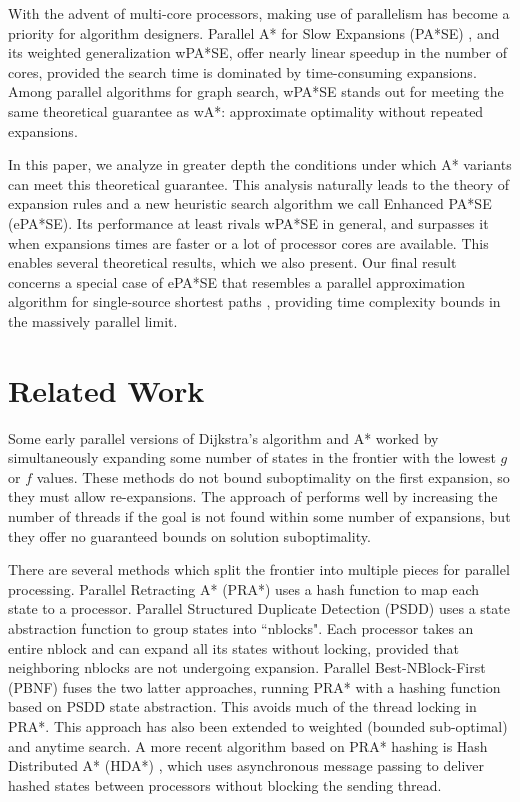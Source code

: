 \documentclass[letterpaper]{article}
\begin{document}
With the advent of multi-core processors, making use of parallelism has become a priority for algorithm designers. Parallel A* for Slow Expansions (PA*SE) \cite{phillips2014pa}, and its weighted generalization wPA*SE, offer nearly linear speedup in the number of cores, provided the search time is dominated by time-consuming expansions. Among parallel algorithms for graph search, wPA*SE stands out for meeting the same theoretical guarantee as wA*: approximate optimality without repeated expansions.

In this paper, we analyze in greater depth the conditions under which A* variants can meet this theoretical guarantee. This analysis naturally leads to the theory of expansion rules and a new heuristic search algorithm we call Enhanced PA*SE (ePA*SE). Its performance at least rivals wPA*SE in general, and surpasses it when expansions times are faster or a lot of processor cores are available. This enables several theoretical results, which we also present. Our final result concerns a special case of ePA*SE that resembles a parallel approximation algorithm for single-source shortest paths \cite{klein1997randomized}, providing time complexity bounds in the massively parallel limit.

\section{Related Work}

Some early parallel versions of Dijkstra’s algorithm \cite{quinn86} and A* \cite{irani86} \cite{leifker85} worked by simultaneously expanding some number of states in the frontier with the lowest $g$ or $f$ values. These methods do not bound suboptimality on the first expansion, so they must allow re-expansions.
The approach of \cite{vidal10} performs well by increasing the number of threads if the goal is not found within some number of expansions, but they offer no guaranteed bounds on solution suboptimality.

There are several methods which split the frontier into multiple pieces for parallel processing.
Parallel Retracting A* (PRA*) \cite{evett95} uses a hash function to map each state to a processor.
Parallel Structured Duplicate Detection (PSDD) \cite{zhou07}
uses a state abstraction function to group states into
``nblocks".
Each processor takes an entire nblock and can expand all its states without locking, provided
that neighboring nblocks are not undergoing expansion.
Parallel Best-NBlock-First (PBNF) \cite{burns_10} fuses the two latter
approaches, running PRA* with a hashing function
based on PSDD state abstraction.
This avoids much of the thread locking in PRA*.
This approach has also been extended to weighted (bounded
sub-optimal) and anytime search.
A more recent algorithm based on PRA* hashing is Hash Distributed A* (HDA*) \cite{kishimoto09},
which uses asynchronous message passing to deliver hashed states between processors without blocking the sending thread.
\end{document}
